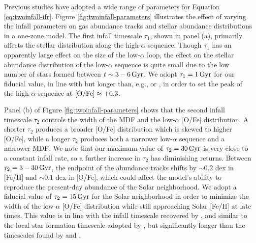 \documentclass[twocolumn,twocolappendix,linenumbers]{aastex631}
\newcommand{\todo}[1]{{\color{red}#1}}
\newcommand{\mathOFe}{{\rm [O/Fe]}}
\begin{document}
Previous studies have adopted a wide range of parameters for Equation \ref{eq:twoinfall-ifr}. Figure \ref{fig:twoinfall-parameters} illustrates the effect of varying the infall parameters on gas abundance tracks and stellar abundance distributions in a one-zone model. The first infall timescale $\tau_1$, shown in panel (a), primarily affects the stellar distribution along the high-$\alpha$ sequence. Though $\tau_1$ has an apparently large effect on the size of the low-$\alpha$ loop, the effect on the stellar abundance distribution of the low-$\alpha$ sequence is quite small due to the low number of stars formed between $t\sim3-6\,{\rm Gyr}$. We adopt $\tau_1=1\,{\rm Gyr}$ for our fiducial value, in line with \citet{spitoni_galactic_2020} but longer than, e.g., \citet{nissen_high-precision_2020} or \citet{spitoni_apogee_2021}, in order to set the peak of the high-$\alpha$ sequence at $\mathOFe\approx+0.3$. 

Panel (b) of Figure \ref{fig:twoinfall-parameters} shows that 
the second infall timescale $\tau_2$ controls the width of the MDF and the low-$\alpha$ [O/Fe] distribution. A shorter $\tau_2$ produces a broader [O/Fe] distribution which is skewed to higher [O/Fe], while a longer $\tau_2$ produces both a narrower low-$\alpha$ sequence and a narrower MDF. We note that our maximum value of $\tau_2=30\,{\rm Gyr}$ is very close to a constant infall rate, so a further increase in $\tau_2$ has diminishing returns. Between $\tau_2=3-30\,{\rm Gyr}$, the endpoint of the abundance tracks shifts by $\sim0.2$ dex in [Fe/H] and $\sim0.1$ dex in [O/Fe], which could affect the model's ability to reproduce the present-day abundance of the Solar neighborhood. We adopt a fiducial value of $\tau_2=15\,{\rm Gyr}$ for the Solar neighborhood in order to minimize the width of the low-$\alpha$ [O/Fe] distribution while still approaching Solar [Fe/H] at late times. This value is in line with the infall timescale recovered by \citet{spitoni_galactic_2020}, and similar to the local star formation timescale adopted by \citet{johnson_stellar_2021}, but significantly longer than the timescales found by \citet{nissen_high-precision_2020} and \citet{spitoni_apogee_2021}. 
\end{document}
